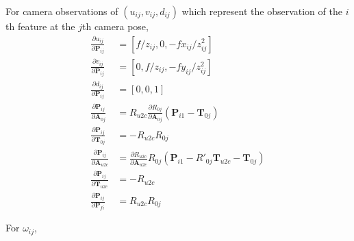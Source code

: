 \documentclass[12pt]{article}   %
\begin{document}
\begin{appendices}
For camera observations of $(u_{ij}, v_{ij}, d_{ij})$ which represent the observation of the $i$th feature at the $j$th camera pose, 
\begin{align}
\frac{\partial u_{ij}}{\partial \textbf{P}_{ij}} &= [f/z_{ij}, 0, -fx_{ij}/z^2_{ij}] \\
\frac{\partial v_{ij}}{\partial \textbf{P}_{ij}} &= [0, f/z_{ij}, -fy_{ij}/z^2_{ij}] \\
\frac{\partial d_{ij}}{\partial \textbf{P}_{ij}} &= [0, 0, 1] \\
\frac{\partial \textbf{P}_{ij}}{\partial \textbf{A}_{0j}} &= R_{u2c} \frac{\partial R_{0j}}{\partial \textbf{A}_{0j}} (\textbf{P}_{i1} - \textbf{T}_{0j}) \\
\frac{\partial \textbf{P}_{ij}}{\partial \textbf{T}_{0j}} &= -R_{u2c} R_{0j} \\
\frac{\partial \textbf{P}_{ij}}{\partial \textbf{A}_{u2c}} &= \frac{\partial R_{u2c}}{\partial \textbf{A}_{u2c}} R_{0j}(\textbf{P}_{i1} - R'_{0j} \textbf{T}_{u2c} - \textbf{T}_{0j}) \\
\frac{\partial \textbf{P}_{ij}}{\partial \textbf{T}_{u2c}} &= -R_{u2c}\\
\frac{\partial \textbf{P}_{ij}}{\partial \textbf{P}_{fi}} &= R_{u2c} R_{0j} 
\end{align}

For $\omega_{ij}$,


\end{appendices}
\end{document}
